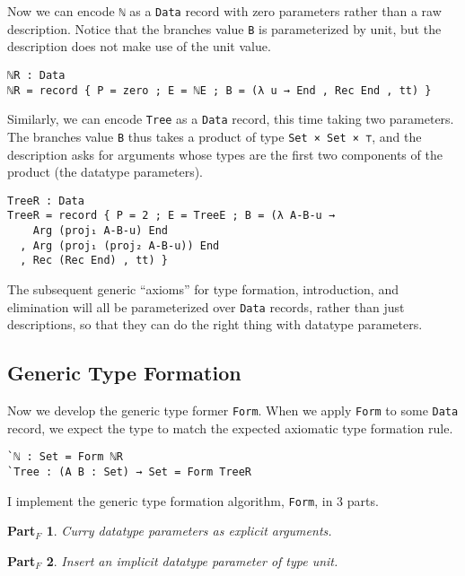 \documentclass[runningheads,a4paper]{llncs}
\newtheorem{mypartf}{Part$_F$}
\begin{document}
Now we can encode {\tt ℕ} as a {\tt Data} record with zero parameters
rather than a raw description. Notice that the branches value {\tt B}
is parameterized by unit, but the description does not make use of the
unit value.

\begin{verbatim}
ℕR : Data
ℕR = record { P = zero ; E = ℕE ; B = (λ u → End , Rec End , tt) }
\end{verbatim}

Similarly, we can encode {\tt Tree} as a {\tt Data} record, this time
taking two parameters. The branches value {\tt B} thus takes a product of
type {\tt Set × Set × ⊤}, and the description asks for arguments whose
types are the first two components of the product (the datatype parameters).

\begin{verbatim}
TreeR : Data
TreeR = record { P = 2 ; E = TreeE ; B = (λ A-B-u →
    Arg (proj₁ A-B-u) End
  , Arg (proj₁ (proj₂ A-B-u)) End
  , Rec (Rec End) , tt) }
\end{verbatim}

The subsequent generic ``axioms'' for type formation, introduction,
and elimination will all be parameterized over {\tt Data} records,
rather than just descriptions, so that they can do the right thing
with datatype parameters.

\subsection{Generic Type Formation}

Now we develop the generic type former {\tt Form}. When we apply
{\tt Form} to some {\tt Data} record, we expect the type to match the
expected axiomatic type formation rule.

\begin{verbatim}
`ℕ : Set = Form ℕR
`Tree : (A B : Set) → Set = Form TreeR
\end{verbatim}

I implement the generic type formation algorithm, {\tt Form},
in 3 parts.

\begin{mypartf}
\label{partf:one}
Curry datatype parameters as explicit arguments.
\end{mypartf}

\begin{mypartf}
\label{partf:two}
Insert an implicit datatype parameter of type unit.
\end{mypartf}
\end{document}
